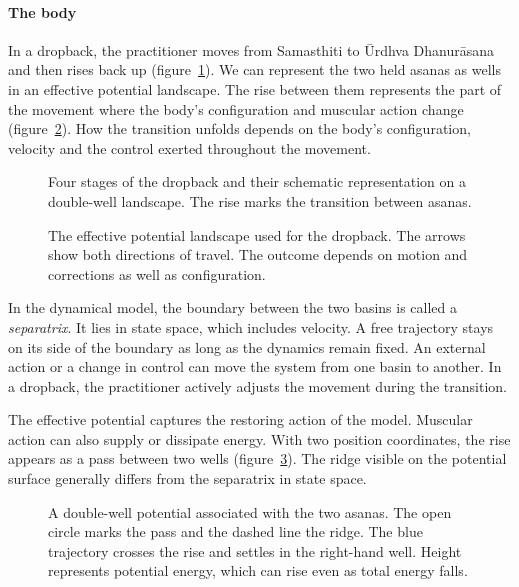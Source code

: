\paragraph{The body} In a dropback, the practitioner moves from Samasthiti to Ūrdhva Dhanurāsana and then rises back up (figure~\ref{fig:sequenza}). We can represent the two held asanas as wells in an effective potential landscape. The rise between them represents the part of the movement where the body's configuration and muscular action change (figure~\ref{fig:dropback}). How the transition unfolds depends on the body's configuration, velocity and the control exerted throughout the movement.

\begin{figure}
\caption{Four stages of the dropback and their schematic representation on a double-well landscape. The rise marks the transition between asanas.}
\label{fig:sequenza}
\end{figure}

\begin{figure}
\caption{The effective potential landscape used for the dropback. The arrows show both directions of travel. The outcome depends on motion and corrections as well as configuration.}
\label{fig:dropback}
\end{figure}

In the dynamical model, the boundary between the two basins is called a \emph{separatrix}. It lies in state space, which includes velocity. A free trajectory stays on its side of the boundary as long as the dynamics remain fixed. An external action or a change in control can move the system from one basin to another. In a dropback, the practitioner actively adjusts the movement during the transition.

The effective potential captures the restoring action of the model. Muscular action can also supply or dissipate energy. With two position coordinates, the rise appears as a pass between two wells (figure~\ref{fig:dropbacktre}). The ridge visible on the potential surface generally differs from the separatrix in state space.

\begin{figure}
\caption{A double-well potential associated with the two asanas. The open circle marks the pass and the dashed line the ridge. The blue trajectory crosses the rise and settles in the right-hand well. Height represents potential energy, which can rise even as total energy falls.}
\label{fig:dropbacktre}
\end{figure}

